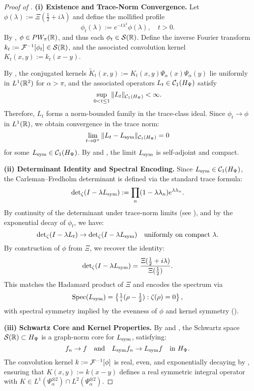 \begin{proof}[Proof of ]
\textbf{(i) Existence and Trace-Norm Convergence.}
Let \( \phi(\lambda) := \Xi(\tfrac{1}{2} + i\lambda) \) and define the mollified profile
\[
\phi_t(\lambda) := e^{-t\lambda^2} \phi(\lambda), \quad t > 0.
\]
By , \( \phi \in PW_\pi(\mathbb{R}) \), and thus each \( \phi_t \in \mathcal{S}(\mathbb{R}) \). Define the inverse Fourier transform \( k_t := \mathcal{F}^{-1}[\phi_t] \in \mathcal{S}(\mathbb{R}) \), and the associated convolution kernel \( K_t(x,y) := k_t(x - y) \).

By , the conjugated kernels \( \widetilde{K}_t(x,y) := K_t(x,y) \Psi_\alpha(x) \Psi_\alpha(y) \) lie uniformly in \( L^1(\mathbb{R}^2) \) for \( \alpha > \pi \), and the associated operators \( L_t \in \mathcal{C}_1(H_{\Psi}) \) satisfy
\[
\sup_{0 < t \le 1} \| L_t \|_{\mathcal{C}_1(H_{\Psi})} < \infty.
\]
Therefore, \( L_t \) forms a norm-bounded family in the trace-class ideal. Since \( \phi_t \to \phi \) in \( L^1(\mathbb{R}) \), we obtain convergence in the trace norm:
\[
\lim_{t \to 0^+} \| L_t - L_{\mathrm{sym}} \|_{\mathcal{C}_1(H_{\Psi})} = 0
\]
for some \( L_{\mathrm{sym}} \in \mathcal{C}_1(H_{\Psi}) \). By  and , the limit \( L_{\mathrm{sym}} \) is self-adjoint and compact.

\medskip
\noindent\textbf{(ii) Determinant Identity and Spectral Encoding.}
Since \( L_{\mathrm{sym}} \in \mathcal{C}_1(H_{\Psi}) \), the Carleman--Fredholm determinant is defined via the standard trace formula:
\[
\det\nolimits_\zeta(I - \lambda L_{\mathrm{sym}}) := \prod_n (1 - \lambda \lambda_n) e^{\lambda \lambda_n}.
\]
By continuity of the determinant under trace-norm limits (see \cite[Ch.~4]{Simon2005TraceIdeals}), and by the exponential decay of \( \phi_t \), we have:
\[
\det\nolimits_\zeta(I - \lambda L_t) \to \det\nolimits_\zeta(I - \lambda L_{\mathrm{sym}}) \quad \text{uniformly on compact } \lambda.
\]
By construction of \( \phi \) from \( \Xi \), we recover the identity:
\[
\det\nolimits_\zeta(I - \lambda L_{\mathrm{sym}}) = \frac{\Xi(\tfrac{1}{2} + i\lambda)}{\Xi(\tfrac{1}{2})}.
\]
This matches the Hadamard product of \( \Xi \) and encodes the spectrum via
\[
\operatorname{Spec}(L_{\mathrm{sym}}) = \left\{ \tfrac{1}{i}(\rho - \tfrac{1}{2}) : \zeta(\rho) = 0 \right\},
\]
with spectral symmetry implied by the evenness of \( \phi \) and kernel symmetry ().

\medskip
\noindent\textbf{(iii) Schwartz Core and Kernel Properties.}
By  and , the Schwartz space \( \mathcal{S}(\mathbb{R}) \subset H_{\Psi} \) is a graph-norm core for \( L_{\mathrm{sym}} \), satisfying:
\[
f_n \to f \quad \text{and} \quad L_{\mathrm{sym}} f_n \to L_{\mathrm{sym}} f \quad \text{in } H_{\Psi}.
\]
The convolution kernel \( k := \mathcal{F}^{-1}[\phi] \) is real, even, and exponentially decaying by , ensuring that \( K(x,y) := k(x - y) \) defines a real symmetric integral operator with \( K \in L^1(\Psi_\alpha^{\otimes 2}) \cap L^2(\Psi_\alpha^{\otimes 2}) \).


\end{proof}
